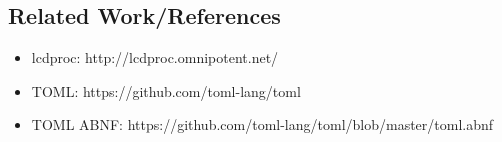 \documentclass[12pt]{article}
\begin{document}
\subsection{Related Work/References}
\begin{itemize}
\item lcdproc: http://lcdproc.omnipotent.net/
\item TOML: https://github.com/toml-lang/toml
\item TOML ABNF: https://github.com/toml-lang/toml/blob/master/toml.abnf 
\end{itemize}
\end{document}
